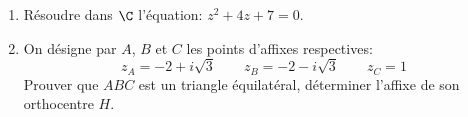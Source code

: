\begin{exercice}

  \begin{enumerate}
  \item R\'esoudre dans $\C$ l'\'equation: $z^2+4z+7=0$.

  \item On d\'esigne par $A$, $B$ et $C$ les points d'affixes respectives:
\[ z_A=-2+i\sqrt3 \qquad z_B=-2-i\sqrt3 \qquad z_C=1 \]
Prouver que $ABC$ est un triangle \'equilat\'eral, d\'eterminer
l'affixe de son orthocentre $H$.
  \end{enumerate}
\end{exercice}
